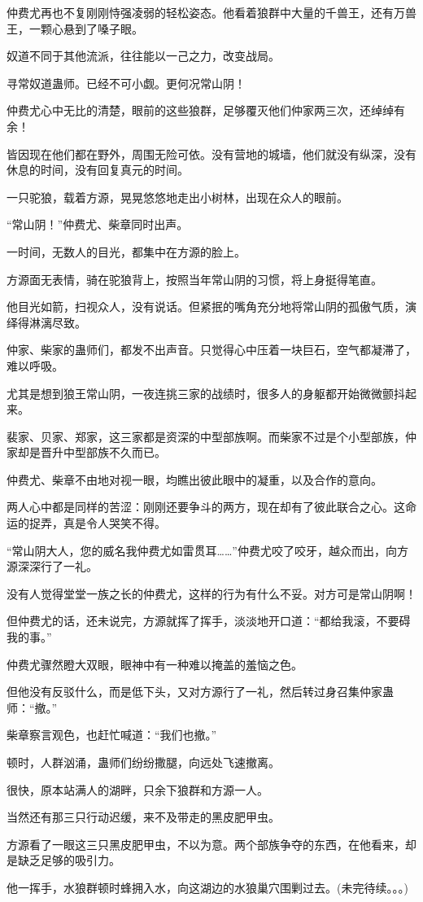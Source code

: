 \begin{this_body}
仲费尤再也不复刚刚恃强凌弱的轻松姿态。他看着狼群中大量的千兽王，还有万兽王，一颗心悬到了嗓子眼。

奴道不同于其他流派，往往能以一己之力，改变战局。

寻常奴道蛊师。已经不可小觑。更何况常山阴！

仲费尤心中无比的清楚，眼前的这些狼群，足够覆灭他们仲家两三次，还绰绰有余！

皆因现在他们都在野外，周围无险可依。没有营地的城墙，他们就没有纵深，没有休息的时间，没有回复真元的时间。

一只驼狼，载着方源，晃晃悠悠地走出小树林，出现在众人的眼前。

“常山阴！”仲费尤、柴章同时出声。

一时间，无数人的目光，都集中在方源的脸上。

方源面无表情，骑在驼狼背上，按照当年常山阴的习惯，将上身挺得笔直。

他目光如箭，扫视众人，没有说话。但紧抿的嘴角充分地将常山阴的孤傲气质，演绎得淋漓尽致。

仲家、柴家的蛊师们，都发不出声音。只觉得心中压着一块巨石，空气都凝滞了，难以呼吸。

尤其是想到狼王常山阴，一夜连挑三家的战绩时，很多人的身躯都开始微微颤抖起来。

裴家、贝家、郑家，这三家都是资深的中型部族啊。而柴家不过是个小型部族，仲家却是晋升中型部族不久而已。

仲费尤、柴章不由地对视一眼，均瞧出彼此眼中的凝重，以及合作的意向。

两人心中都是同样的苦涩：刚刚还要争斗的两方，现在却有了彼此联合之心。这命运的捉弄，真是令人哭笑不得。

“常山阴大人，您的威名我仲费尤如雷贯耳……”仲费尤咬了咬牙，越众而出，向方源深深行了一礼。

没有人觉得堂堂一族之长的仲费尤，这样的行为有什么不妥。对方可是常山阴啊！

但仲费尤的话，还未说完，方源就挥了挥手，淡淡地开口道：“都给我滚，不要碍我的事。”

仲费尤骤然瞪大双眼，眼神中有一种难以掩盖的羞恼之色。

但他没有反驳什么，而是低下头，又对方源行了一礼，然后转过身召集仲家蛊师：“撤。”

柴章察言观色，也赶忙喊道：“我们也撤。”

顿时，人群汹涌，蛊师们纷纷撒腿，向远处飞速撤离。

很快，原本站满人的湖畔，只余下狼群和方源一人。

当然还有那三只行动迟缓，来不及带走的黑皮肥甲虫。

方源看了一眼这三只黑皮肥甲虫，不以为意。两个部族争夺的东西，在他看来，却是缺乏足够的吸引力。

他一挥手，水狼群顿时蜂拥入水，向这湖边的水狼巢穴围剿过去。(未完待续。。。)

\end{this_body}

